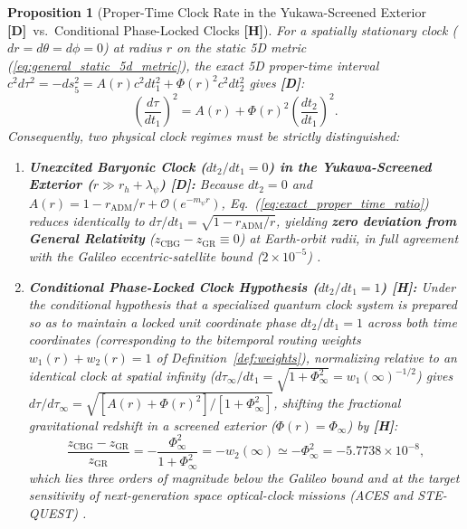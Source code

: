 \documentclass[11pt,a4paper]{article}
\newcommand{\catD}{\textbf{\textcolor{blue!75!black}{[D]}}}
\newcommand{\catH}{\textbf{\textcolor{orange!85!black}{[H]}}}
\newtheorem{proposition}[theorem]{Proposition}
\theoremstyle{definition}
\theoremstyle{remark}
\begin{document}
\begin{proposition}[Proper-Time Clock Rate in the Yukawa-Screened Exterior \catD\ vs.\ Conditional Phase-Locked Clocks \catH]
\label{prop:space_clock_redshift}
For a spatially stationary clock ($dr = d\theta = d\phi = 0$) at radius $r$ on the static 5D metric (\ref{eq:general_static_5d_metric}), the exact 5D proper-time interval $c^2 d\tau^2 = -ds_5^2 = A(r)c^2 dt_1^2 + \Phi(r)^2 c^2 dt_2^2$ gives \catD:
\begin{equation}
  \left(\frac{d\tau}{dt_1}\right)^2 = A(r) + \Phi(r)^2\left(\frac{dt_2}{dt_1}\right)^2.
  \label{eq:exact_proper_time_ratio}
\end{equation}
Consequently, two physical clock regimes must be strictly distinguished:
\begin{enumerate}
  \item[\textnormal{(i)}] \textbf{Unexcited Baryonic Clock ($dt_2/dt_1 = 0$) in the Yukawa-Screened Exterior ($r \gg r_h + \lambda_{\psi}$) \catD:} Because $dt_2 = 0$ and $A(r) = 1 - r_{\text{ADM}}/r + \mathcal{O}(e^{-m_{\psi}r})$, Eq.~(\ref{eq:exact_proper_time_ratio}) reduces identically to $d\tau/dt_1 = \sqrt{1 - r_{\text{ADM}}/r}$, yielding \textbf{zero deviation from General Relativity} ($z_{\text{CBG}} - z_{\text{GR}} \equiv 0$) at Earth-orbit radii, in full agreement with the Galileo eccentric-satellite bound ($2 \times 10^{-5}$) \cite{Delva2018}.
  \item[\textnormal{(ii)}] \textbf{Conditional Phase-Locked Clock Hypothesis ($dt_2/dt_1 = 1$) \catH:} Under the conditional hypothesis that a specialized quantum clock system is prepared so as to maintain a locked unit coordinate phase $dt_2/dt_1 = 1$ across both time coordinates (corresponding to the bitemporal routing weights $w_1(r) + w_2(r) = 1$ of Definition~\ref{def:weights}), normalizing relative to an identical clock at spatial infinity ($d\tau_{\infty}/dt_1 = \sqrt{1 + \Phi_{\infty}^2} = w_1(\infty)^{-1/2}$) gives $d\tau/d\tau_{\infty} = \sqrt{[A(r) + \Phi(r)^2]/[1 + \Phi_{\infty}^2]}$, shifting the fractional gravitational redshift in a screened exterior ($\Phi(r) = \Phi_{\infty}$) by \catH:
  \begin{equation}
    \frac{z_{\text{CBG}} - z_{\text{GR}}}{z_{\text{GR}}} = -\frac{\Phi_{\infty}^2}{1 + \Phi_{\infty}^2} = -w_2(\infty) \simeq -\Phi_{\infty}^2 = -5.7738 \times 10^{-8},
    \label{eq:clock_redshift_shift}
  \end{equation}
  which lies three orders of magnitude below the Galileo bound \cite{Delva2018} and at the target sensitivity of next-generation space optical-clock missions (ACES and STE-QUEST) \cite{ACES2009,STEQUEST2015}.
\end{enumerate}
\end{proposition}
\end{document}
